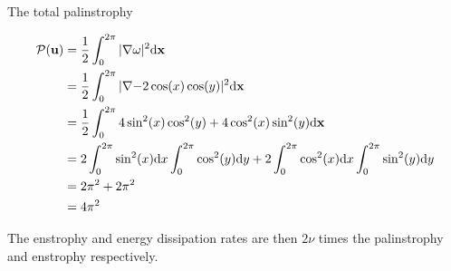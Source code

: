 \documentclass[9pt]{article}
\newcommand{\grad}[1]{\nabla{#1}}								%
\newcommand{\bfu}{\mathbf{u}}											%
\newcommand{\bfx}{\mathbf{x}}								%
\begin{document}
The total palinstrophy

\begin{align}
\mathcal{P}(\bfu) &= \frac{1}{2}\int_0^{2\pi} |\grad{\omega}|^2 \mathrm{d}\bfx \notag \\
									&= \frac{1}{2}\int_0^{2\pi} |\grad{-2\cos(x)\cos(y)}|^2 \mathrm{d}\bfx \notag \\
									&= \frac{1}{2}\int_0^{2\pi} 4\sin^2(x)\cos^2(y) + 4\cos^2(x)\sin^2(y) \mathrm{d}\bfx \notag \\
									&= 2\int_0^{2\pi} \sin^2(x)\mathrm{d}x\int_0^{2\pi}\cos^2(y)\mathrm{d}y + 2\int_0^{2\pi}\cos^2(x)\mathrm{d}x\int_0^{2\pi}\sin^2(y) \mathrm{d}y \notag \\
									&= 2\pi^2 + 2\pi^2 \notag \\
									&= 4\pi^2
\end{align}

The enstrophy and energy dissipation rates are then $2\nu$ times the palinstrophy and enstrophy respectively.
\end{document}
